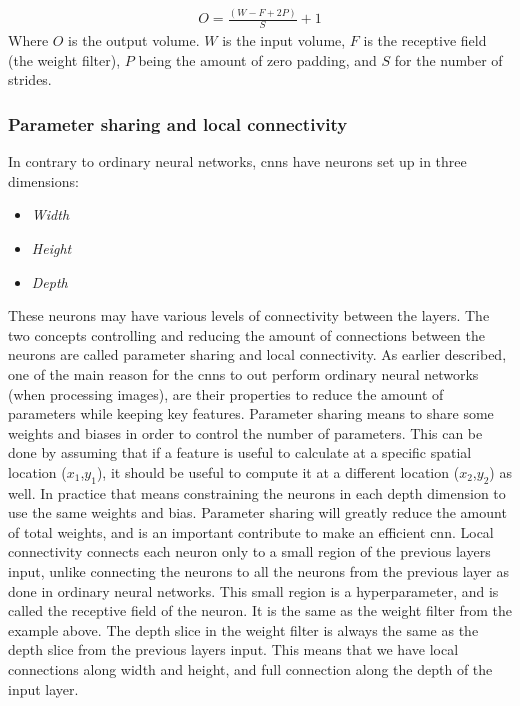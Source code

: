 \documentclass[USenglish]{ifimaster}  %
\begin{document}
\begin{equation}\label{eq:output_conv}
\begin{aligned}
O = \frac{(W - F + 2P)}{S}+1
\end{aligned}
\end{equation}
Where $O$ is the output volume. $W$ is the input volume, $F$ is the receptive field (the weight filter), $P$ being the amount of zero padding, and $S$ for the number of strides.
 
\subsubsection{Parameter sharing and local connectivity}
In contrary to ordinary neural networks, \acp{cnn} have neurons set up in three dimensions:
\begin{itemize}
    \item \textit{Width}
    \item \textit{Height}
    \item \textit{Depth}
\end{itemize}
These neurons may have various levels of connectivity between the layers. The two concepts controlling and reducing the amount of connections between the neurons are called parameter sharing and local connectivity. As earlier described, one of the main reason for the \acp{cnn} to out perform ordinary neural networks (when processing images), are their properties to reduce the amount of parameters while keeping key features. 
\newline
\newline
Parameter sharing means to share some weights and biases in order to control the number of parameters. This can be done by assuming that if a feature is useful to calculate at a specific spatial location ($x_1$,$y_1$), it should be useful to compute it at a different location ($x_2$,$y_2$) as well. In practice that means constraining the neurons in each depth dimension to use the same weights and bias. Parameter sharing will greatly reduce the amount of total weights, and is an important contribute to make an efficient \ac{cnn}. 
\newline
\newline
Local connectivity connects each neuron only to a small region of the previous layers input, unlike connecting the neurons to all the neurons from the previous layer as done in ordinary neural networks.
This small region is a hyperparameter, and is called the receptive field of the neuron. It is the same as the weight filter from the example above. The depth slice in the weight filter is always the same as the depth slice from the previous layers input. This means that we have local connections along width and height, and full connection along the depth of the input layer.
\end{document}
